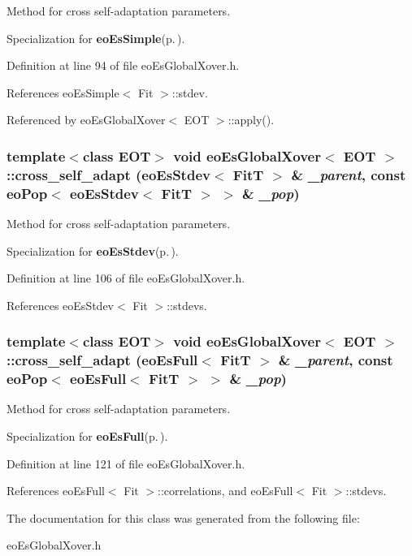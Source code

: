Method for cross self-adaptation parameters. 

Specialization for {\bf eo\-Es\-Simple}{\rm (p.\,\pageref{classeo_es_simple})}. 

Definition at line 94 of file eo\-Es\-Global\-Xover.h.

References eo\-Es\-Simple$<$ Fit $>$::stdev.

Referenced by eo\-Es\-Global\-Xover$<$ EOT $>$::apply().
\subsubsection{\setlength{\rightskip}{0pt plus 5cm}template$<$class EOT$>$ void {\bf eo\-Es\-Global\-Xover}$<$ {\bf EOT} $>$::cross\_\-self\_\-adapt ({\bf eo\-Es\-Stdev}$<$ Fit\-T $>$ \& {\em \_\-parent}, const {\bf eo\-Pop}$<$ {\bf eo\-Es\-Stdev}$<$ Fit\-T $>$ $>$ \& {\em \_\-pop})\hspace{0.3cm}{\tt  [inline, private]}}\label{classeo_es_global_xover_d1}


Method for cross self-adaptation parameters. 

Specialization for {\bf eo\-Es\-Stdev}{\rm (p.\,\pageref{classeo_es_stdev})}. 

Definition at line 106 of file eo\-Es\-Global\-Xover.h.

References eo\-Es\-Stdev$<$ Fit $>$::stdevs.
\subsubsection{\setlength{\rightskip}{0pt plus 5cm}template$<$class EOT$>$ void {\bf eo\-Es\-Global\-Xover}$<$ {\bf EOT} $>$::cross\_\-self\_\-adapt ({\bf eo\-Es\-Full}$<$ Fit\-T $>$ \& {\em \_\-parent}, const {\bf eo\-Pop}$<$ {\bf eo\-Es\-Full}$<$ Fit\-T $>$ $>$ \& {\em \_\-pop})\hspace{0.3cm}{\tt  [inline, private]}}\label{classeo_es_global_xover_d2}


Method for cross self-adaptation parameters. 

Specialization for {\bf eo\-Es\-Full}{\rm (p.\,\pageref{classeo_es_full})}. 

Definition at line 121 of file eo\-Es\-Global\-Xover.h.

References eo\-Es\-Full$<$ Fit $>$::correlations, and eo\-Es\-Full$<$ Fit $>$::stdevs.

The documentation for this class was generated from the following file:\begin{CompactItemize}
\item 
eo\-Es\-Global\-Xover.h\end{CompactItemize}

